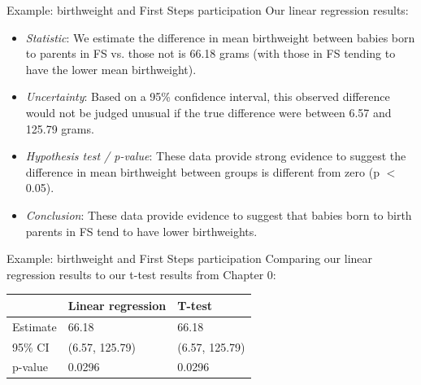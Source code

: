 \documentclass[10pt,t]{beamer}
\begin{document}
\begin{frame}{Example: birthweight and First Steps participation}
Our linear regression results:

\vspace{0.3cm}

\begin{itemize}
	\item \textit{Statistic}: We estimate the difference in mean birthweight between babies born to parents in FS vs. those not is 66.18 grams (with those in FS tending to have the lower mean birthweight).
	\item \textit{Uncertainty}: Based on a 95\% confidence interval, this observed difference would not be judged unusual if the true difference were between 6.57 and 125.79 grams.
	\item \textit{Hypothesis test / p-value}: These data provide strong evidence to suggest the difference in mean birthweight between groups is different from zero (p $<$ 0.05).
	\item \textit{Conclusion}: These data provide evidence to suggest that babies born to birth parents in FS tend to have lower birthweights.
\end{itemize}
\end{frame}

\begin{frame}{Example: birthweight and First Steps participation}
Comparing our linear regression results to our t-test results from Chapter 0:

\vspace{0.3cm}

\begin{table}[]
	\begin{tabular}{l|ll}
		& Linear regression & T-test         \\ \hline
		Estimate & 66.18             & 66.18          \\ \hline
		95\% CI  & (6.57, 125.79)    & (6.57, 125.79) \\ \hline
		p-value  & 0.0296            & 0.0296        
	\end{tabular}
\end{table}

\end{frame}
\end{document}
